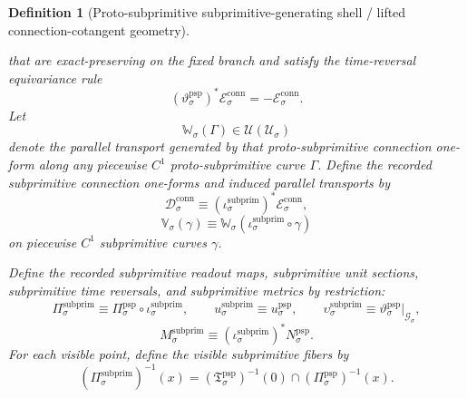 \documentclass[11pt]{article}
\newcommand{\RootClass}[1]{\mathscr U_{#1}}
\newcommand{\SubprimSpace}[1]{\mathcal G_{#1}}
\newcommand{\SubprimRead}[1]{\Pi_{#1}^{\mathrm{subprim}}}
\newcommand{\SubprimUnit}[1]{u_{#1}^{\mathrm{subprim}}}
\newcommand{\SubprimTimeRev}[1]{\upsilon_{#1}^{\mathrm{subprim}}}
\newcommand{\SubprimMetric}[1]{M_{#1}^{\mathrm{subprim}}}
\newcommand{\SubprimInc}[1]{\iota_{#1}^{\mathrm{subprim}}}
\newcommand{\SubprimConnectionForm}[1]{\mathcal D_{#1}^{\mathrm{conn}}}
\newcommand{\SubprimTransport}[1]{\mathbb V_{#1}}
\newcommand{\ProtoSubprimRead}[1]{\Pi_{#1}^{\mathrm{psp}}}
\newcommand{\ProtoSubprimUnit}[1]{u_{#1}^{\mathrm{psp}}}
\newcommand{\ProtoSubprimTimeRev}[1]{\vartheta_{#1}^{\mathrm{psp}}}
\newcommand{\ProtoSubprimMetric}[1]{N_{#1}^{\mathrm{psp}}}
\newcommand{\ProtoSubprimSection}[1]{\mathfrak T_{#1}^{\mathrm{psp}}}
\newcommand{\ProtoSubprimConnectionForm}[1]{\mathcal E_{#1}^{\mathrm{conn}}}
\newcommand{\ProtoSubprimTransport}[1]{\mathbb W_{#1}}
\newtheorem{definition}{Definition}
\begin{document}
\begin{definition}[Proto-subprimitive subprimitive-generating shell / lifted connection-cotangent geometry]
\begin{enumerate}
\[    \]
    that are exact-preserving on the fixed branch and satisfy the time-reversal equivariance rule
    \[
    (\ProtoSubprimTimeRev{\sigma})^*\ProtoSubprimConnectionForm{\sigma}
    =
    -\ProtoSubprimConnectionForm{\sigma}.
    \]
    Let
    \[
    \ProtoSubprimTransport{\sigma}(\Gamma)\in \mathcal U(\RootClass{\sigma})
    \]
    denote the parallel transport generated by that proto-subprimitive connection one-form along any piecewise \(C^1\) proto-subprimitive curve \(\Gamma\). Define the recorded subprimitive connection one-forms and induced parallel transports by
    \begin{equation}
    \SubprimConnectionForm{\sigma}\equiv (\SubprimInc{\sigma})^*\ProtoSubprimConnectionForm{\sigma},
    \label{eq:subprimitive_connection_from_protosubprimitive}
    \end{equation}
    \begin{equation}
    \SubprimTransport{\sigma}(\gamma)\equiv \ProtoSubprimTransport{\sigma}(\SubprimInc{\sigma}\circ\gamma)
    \label{eq:subprimitive_transport_from_protosubprimitive}
    \end{equation}
    on piecewise \(C^1\) subprimitive curves \(\gamma\).
\end{enumerate}

Define the recorded subprimitive readout maps, subprimitive unit sections, subprimitive time reversals, and subprimitive metrics by restriction:
\begin{equation}
\SubprimRead{\sigma}\equiv \ProtoSubprimRead{\sigma}\circ\SubprimInc{\sigma},
\qquad
\SubprimUnit{\sigma}\equiv \ProtoSubprimUnit{\sigma},
\qquad
\SubprimTimeRev{\sigma}\equiv \ProtoSubprimTimeRev{\sigma}|_{\SubprimSpace{\sigma}},
\label{eq:subprimitive_basic_structure_from_protosubprimitive}
\end{equation}
\begin{equation}
\SubprimMetric{\sigma}\equiv (\SubprimInc{\sigma})^*\ProtoSubprimMetric{\sigma}.
\label{eq:subprimitive_metric_from_protosubprimitive}
\end{equation}
For each visible point, define the visible subprimitive fibers by
\begin{equation}
(\SubprimRead{\sigma})^{-1}(x)
=
\left(\ProtoSubprimSection{\sigma}\right)^{-1}(0)\cap(\ProtoSubprimRead{\sigma})^{-1}(x).
\label{eq:subprimitive_fiber_from_protosubprimitive}
\end{equation}
\end{definition}
\end{document}
